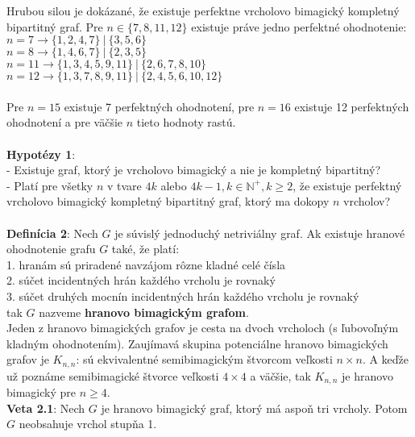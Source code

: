 \documentclass[12pt]{article}
\begin{document}
Hrubou silou je dokázané, že existuje perfektne vrcholovo bimagický kompletný bipartitný graf. Pre $n \in \{7, 8, 11, 12\}$ existuje práve jedno perfektné ohodnotenie: \\
$n = 7 \rightarrow \{1, 2, 4, 7\} ~|~ \{3, 5, 6\}$ \\
$n = 8 \rightarrow \{1, 4, 6, 7\} ~|~ \{2, 3, 5\}$ \\
$n = 11 \rightarrow \{1, 3, 4, 5, 9, 11\} ~|~ \{2, 6, 7, 8, 10\}$ \\
$n = 12 \rightarrow \{1, 3, 7, 8, 9, 11\} ~|~ \{2, 4, 5, 6, 10, 12\}$ \\\\

Pre $n = 15$ existuje 7 perfektných ohodnotení, pre $n = 16$ existuje 12 perfektných ohodnotení a pre väčšie $n$ tieto hodnoty rastú. \\\\

\textbf{Hypotézy 1}: \\
- Existuje graf, ktorý je vrcholovo bimagický a nie je kompletný bipartitný? \\
- Platí pre všetky $n$ v tvare $4k$ alebo $4k-1, k \in \mathbb{N^+}, k \geq 2$, že existuje perfektný vrcholovo bimagický kompletný bipartitný graf, ktorý ma dokopy $n$ vrcholov? \\\\

\textbf{Definícia 2}: Nech $G$ je súvislý jednoduchý netriviálny graf. Ak existuje hranové ohodnotenie grafu $G$ také, že platí: \\
1. hranám sú priradené navzájom rôzne kladné celé čísla \\
2. súčet incidentných hrán každého vrcholu je rovnaký \\
3. súčet druhých mocnín incidentných hrán každého vrcholu je rovnaký \\
tak $G$ nazveme \textbf{hranovo bimagickým grafom}. \\

Jeden z hranovo bimagických grafov je cesta na dvoch vrcholoch (s ľubovoľným kladným ohodnotením). Zaujímavá skupina potenciálne hranovo bimagických grafov je $K _{n,n}$: sú ekvivalentné semibimagickým štvorcom veľkosti $n \times n$. A keďže už poznáme semibimagické štvorce veľkosti $4 \times 4$ a väčšie, tak $K _{n,n}$ je hranovo bimagický pre $n \geq 4$.  \\

\textbf{Veta 2.1}: Nech $G$ je hranovo bimagický graf, ktorý má aspoň tri vrcholy. Potom $G$ neobsahuje vrchol stupňa 1. \\
\end{document}
